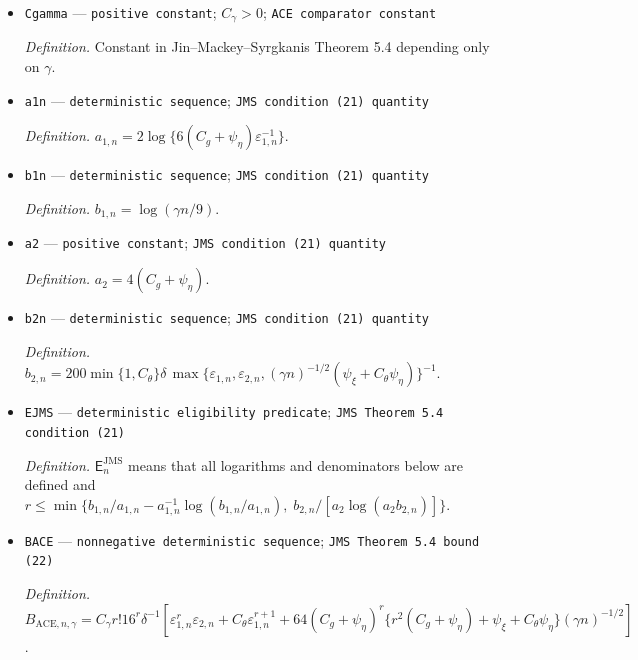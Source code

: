 \documentclass{article}
\begin{document}
\begin{itemize}
  \par\smallskip\noindent\emph{Definition.} \(\mathfrak M_{n,1-\gamma}^{\mathrm G}=\inf_{\widetilde\theta}\sup_{P\in\mathcal P_{\mathrm G,n}^{\mathrm{JMS}}}Q_{P,1-\gamma}(|\widetilde\theta-\theta_0(P)|)\) is the minimax generalized-quantile error on the simultaneous Gaussian intersection.
  \item \texttt{Cgamma} --- \texttt{positive constant}; \(C_{\gamma}>0\); \texttt{ACE comparator constant}
  \par\smallskip\noindent\emph{Definition.} Constant in Jin--Mackey--Syrgkanis Theorem 5.4 depending only on \(\gamma\).
  \item \texttt{a1n} --- \texttt{deterministic sequence}; \texttt{JMS condition (21) quantity}
  \par\smallskip\noindent\emph{Definition.} \(a_{1,n}=2\log\{6(C_g+\psi_{\eta})\varepsilon_{1,n}^{-1}\}\).
  \item \texttt{b1n} --- \texttt{deterministic sequence}; \texttt{JMS condition (21) quantity}
  \par\smallskip\noindent\emph{Definition.} \(b_{1,n}=\log(\gamma n/9)\).
  \item \texttt{a2} --- \texttt{positive constant}; \texttt{JMS condition (21) quantity}
  \par\smallskip\noindent\emph{Definition.} \(a_2=4(C_g+\psi_{\eta})\).
  \item \texttt{b2n} --- \texttt{deterministic sequence}; \texttt{JMS condition (21) quantity}
  \par\smallskip\noindent\emph{Definition.} \(b_{2,n}=200\min\{1,C_{\theta}\}\delta\,\max\{\varepsilon_{1,n},\varepsilon_{2,n},(\gamma n)^{-1/2}(\psi_{\xi}+C_{\theta}\psi_{\eta})\}^{-1}\).
  \item \texttt{EJMS} --- \texttt{deterministic eligibility predicate}; \texttt{JMS Theorem 5.4 condition (21)}
  \par\smallskip\noindent\emph{Definition.} \(\mathsf E_n^{\mathrm{JMS}}\) means that all logarithms and denominators below are defined and \(r\le\min\{b_{1,n}/a_{1,n}-a_{1,n}^{-1}\log(b_{1,n}/a_{1,n}),\;b_{2,n}/[a_2\log(a_2b_{2,n})]\}\).
  \item \texttt{BACE} --- \texttt{nonnegative deterministic sequence}; \texttt{JMS Theorem 5.4 bound (22)}
  \par\smallskip\noindent\emph{Definition.} \(B_{\mathrm{ACE},n,\gamma}=C_{\gamma}r!16^r\delta^{-1}[\varepsilon_{1,n}^r\varepsilon_{2,n}+C_{\theta}\varepsilon_{1,n}^{r+1}+64(C_g+\psi_{\eta})^r\{r^2(C_g+\psi_{\eta})+\psi_{\xi}+C_{\theta}\psi_{\eta}\}(\gamma n)^{-1/2}]\).

\end{itemize}
\end{document}
